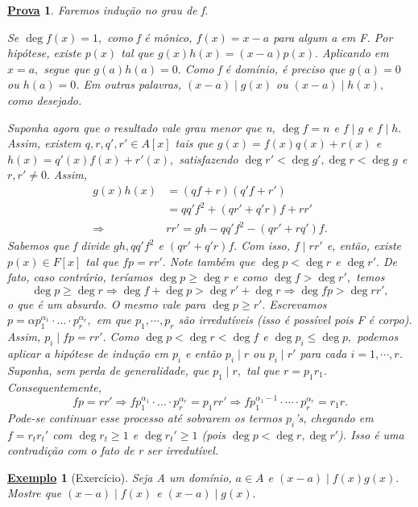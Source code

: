 \documentclass{article}
\newtheorem{example}{\underline{Exemplo}}
\newtheorem*{proof*}{\underline{Prova}}
\begin{document}
\begin{proof*}
  Faremos indução no grau de f.

  Se \(\deg{f(x)} = 1,\) como f é mônico, \(f(x) = x-a\) para algum a em F. Por hipótese, existe \(p(x)\) tal que
  \(g(x)h(x) = (x-a)p(x).\) Aplicando em \(x=a,\) segue que \(g(a)h(a) = 0.\) Como f é domínio, é preciso que
  \(g(a) = 0\) ou \(h(a) = 0\). Em outras palavras, \((x-a)\mid g(x)\) ou \((x-a)\mid h(x),\) como desejado.

  Suponha agora que o resultado vale grau menor que n, \(\deg{f} = n\) e \(f\mid g\) e \(f\mid h.\) Assim, existem 
  \(q, r, q', r'\in A[x]\) tais que \(g(x) = f(x)q(x) + r(x)\) e \(h(x) = q'(x)f(x) + r'(x),\) satisfazendo
  \(\deg{r'} < \deg{g'}, \deg{r} < \deg{g}\) e \(r, r'\neq 0.\) Assim,
  \begin{align*}
    g(x)h(x) &= (qf + r)(q'f + r')\\
             &= qq'f^{2} + (qr' + q'r)f + rr'\\
    \Rightarrow & rr' = gh - qq'f^{2} - (qr' + rq')f.
  \end{align*}
  Sabemos que f divide \(gh, qq'f^{2}\) e \((qr' + q'r)f.\) Com isso, \(f\mid rr'\) e, então,
  existe \(p(x)\in F[x]\) tal que \(fp = rr'.\) Note também que \(\deg{p} < \deg{r} \) e \(\deg{r'}.\) De fato,
  caso contrário, teríamos \(\deg{p}\geq \deg{r}\) e como \(\deg{f} > \deg{r'},\) temos 
  \[
    \deg{p}\geq \deg{r} \Rightarrow \deg{f} + \deg{p} > \deg{r'} + \deg{r} \Rightarrow \deg{fp} > \deg{rr'},
  \]
  o que é um absurdo. O mesmo vale para \(\deg{p}\geq r'.\) Escrevamos \(p = \alpha p_{1}^{\alpha_{1}}\cdot \dotsc \cdot p_{r}^{\alpha_{r}},\) 
  em que \(p_{1}, \cdots, p_{r}\) são irredutíveis (isso é possível pois F é corpo). Assim, \(p_{i}\mid fp = rr'.\) 
  Como \(\deg{p} < \deg{r} < \deg{f}\) e \(\deg{p_{i}}\leq \deg{p},\) podemos aplicar a hipótese de indução em \(p_{i}\) e então
  \(p_{i}\mid r\) ou \(p_{i}\mid r'\) para cada \(i=1, \cdots, r\). Suponha, sem perda de generalidade, que \(p_{1}\mid r,\) tal que 
  \(r=p_{1}r_{1}\). Consequentemente, 
  \[
    fp = rr' \Rightarrow fp_{1}^{\alpha_{1}}\cdot \dotsc \cdot p_{r}^{\alpha_{r}} = p_{1}rr' \Rightarrow fp_{1}^{\alpha_{1} -1}\cdot \cdots \cdot p_{r}^{\alpha_{r}} = r_{1}r.
  \]
  Pode-se continuar esse processo até sobrarem os termos \(p_{i}\)'s, chegando em
  \(f = r_{t}r_{t}'\) com \(\deg{r_{t}}\geq 1\) e \(\deg{r_{t}'}\geq 1\) (pois \(\deg{p} < \deg{r}, \deg{r'}\)). Isso é uma contradição
  com o fato de r ser irredutível.
\end{proof*}
\begin{example}[Exercício]
  Seja A um domínio, \(a\in A\) e \((x-a)\mid f(x)g(x).\) Mostre que \((x-a)\mid f(x)\) e \((x-a)\mid g(x).\) 
\end{example}
\end{document}
